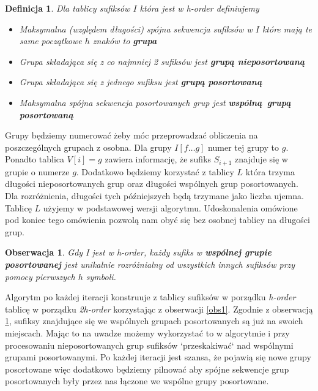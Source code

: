 \documentclass[12pt]{article}
\newtheorem{observation}{Obserwacja}
\newtheorem*{definition}{Definicja}
\begin{document}
\begin{definition}
Dla tablicy sufiksów $I$ która jest w \textit{h-order} definiujemy
\begin{itemize}
    \item Maksymalna (względem długości) spójna sekwencja sufiksów w $I$ które mają te same początkowe $h$ znaków to \textbf{grupa}
    \item Grupa składająca się z co najmniej 2 sufiksów jest \textbf{grupą nieposortowaną}
    \item Grupa składająca się z jednego sufiksu jest \textbf{grupą posortowaną}
    \item Maksymalna spójna sekwencja posortowanych grup jest \textbf{wspólną grupą posortowaną}
\end{itemize}
\end{definition}
Grupy będziemy numerować żeby móc przeprowadzać obliczenia na poszczególnych grupach z osobna. Dla grupy $I[f \ldots g]$ numer tej grupy to $g$. Ponadto tablica $V[i] = g$ zawiera informację, że sufiks $S_{i+1}$ znajduje się w grupie o numerze $g$. Dodatkowo będziemy korzystać z tablicy $L$ która trzyma długości nieposortowanych grup oraz długości wspólnych grup posortowanych. Dla rozróżnienia, długości tych późniejszych będą trzymane jako liczba ujemna. Tablicę $L$ użyjemy w podstawowej wersji algorytmu. Udoskonalenia omówione pod koniec tego omówienia pozwolą nam obyć się bez osobnej tablicy na długości grup.
\begin{observation}
\label{obs2}
Gdy I jest w \textit{h-order}, każdy sufiks w \textbf{wspólnej grupie posortowanej} jest unikalnie rozróżnialny od wszystkich innych sufiksów przy pomocy pierwszych $h$ symboli.
\end{observation}
Algorytm po każdej iteracji konstruuje z tablicy sufiksów w porządku \textit{h-order} tablicę w porządku \textit{2h-order} korzystając z obserwacji \ref{obs1}. Zgodnie z obserwacją \ref{obs2}, sufiksy znajdujące się we wspólnych grupach posortowanych są już na swoich miejscach. Mając to na uwadze możemy wykorzystać to w algorytmie i przy procesowaniu nieposortowanych grup sufiksów `przeskakiwać` nad wspólnymi grupami posortowanymi. Po każdej iteracji jest szansa, że pojawią się nowe grupy posortowane więc dodatkowo będziemy pilnować aby spójne sekwencje grup posortowanych były przez nas łączone we wspólne grupy posortowane.
\end{document}
